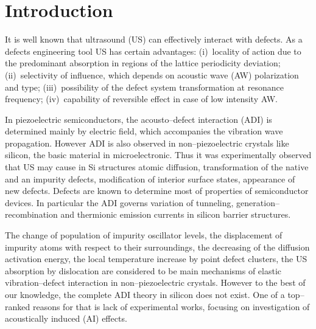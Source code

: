\documentclass[aip,jap, amsmath,amssymb,reprint]{revtex4-1}
\begin{document}
\section{Introduction}
It is well known that ultrasound (US) can effectively interact with defects.
As a defects engineering tool US has certain advantages:
(i)~locality of action due to the predominant absorption in regions of the lattice periodicity deviation;
(ii)~selectivity of influence, which depends on acoustic wave (AW) polarization and type;
(iii)~possibility of the defect system transformation at resonance frequency;
(iv)~capability of reversible effect in case of low intensity AW.

In piezoelectric semiconductors, the acousto--defect interaction (ADI) is determined mainly by electric field, which accompanies the vibration wave propagation.
However ADI is also observed in non--piezoelectric crystals like silicon, the basic material in microelectronic.
Thus it was experimentally observed that US may cause in  Si structures
atomic diffusion, \cite{Roman:2010JAP,Roman:2007APL}
transformation of the native and an impurity defects, \cite{Ostapenko1994,Korotchenkov1995,Olikh2009Sem,Ostapenko1995,Ostrovskii2001}
modification of interior surface states,\cite{UST:Medvid,Zaver:2008,Mirsagatov}
appearance of new defects. \cite{Savkina2015,Virot}
Defects are known to determine most of properties of semiconductor devices.
In particular the ADI governs variation of tunneling, \cite{Olikh2016JSem,Olikh2011Sem} generation--recombination \cite{Davletova2009,Davletova2008,YOlikh2005} and  thermionic emission \cite{OlikhJAP,Olikh:Ultras} currents in silicon barrier structures.

The change  of  population  of  impurity  oscillator  levels,  \cite{Pavlovich}
the displacement of impurity atoms with respect to their surroundings, \cite{Korotchenkov1995,MirzadeJAP2011,PeleshchakUJF2016}
the decreasing of the diffusion activation  energy, \cite{Krevchik}
the local temperature increase by point defect clusters, \cite{MirzadeJAP2005}
the US absorption by dislocation\cite{Davletova2008,OstrovKor92,Olikh:Ultras2016}
are considered to be main mechanisms of elastic vibration--defect interaction in non--piezoelectric crystals.
However to the best of our knowledge, the complete ADI theory in silicon does not exist.
One of a top--ranked reasons for that
is lack of experimental works, focusing on investigation of acoustically induced (AI) effects.
\end{document}
